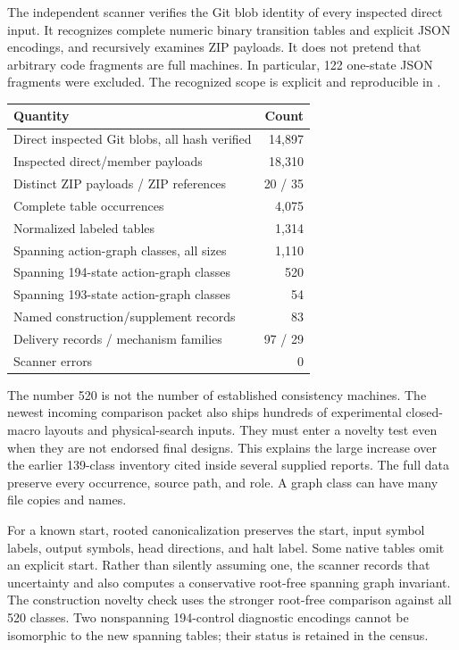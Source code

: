 \documentclass[11pt]{article}
\begin{document}
The independent scanner verifies the Git blob identity of every inspected
direct input. It recognizes complete numeric binary transition tables
and explicit JSON encodings, and recursively examines ZIP payloads.
It does not pretend that arbitrary code fragments are full machines.
In particular, 122 one-state JSON fragments were excluded. The recognized
scope is explicit and reproducible in .

\begin{center}
\begin{tabular}{lr}
\toprule
Quantity & Count\\
\midrule
Direct inspected Git blobs, all hash verified &14,897\\
Inspected direct/member payloads &18,310\\
Distinct ZIP payloads / ZIP references &20 / 35\\
Complete table occurrences &4,075\\
Normalized labeled tables &1,314\\
Spanning action-graph classes, all sizes &1,110\\
Spanning 194-state action-graph classes &520\\
Spanning 193-state action-graph classes &54\\
Named construction/supplement records &83\\
Delivery records / mechanism families &97 / 29\\
Scanner errors &0\\
\bottomrule
\end{tabular}
\end{center}

The number 520 is not the number of established consistency machines.
The newest incoming comparison packet also ships hundreds of experimental
closed-macro layouts and physical-search inputs. They must enter a
novelty test even when they are not endorsed final designs. This explains
the large increase over the earlier 139-class inventory cited inside
several supplied reports. The full data preserve every occurrence,
source path, and role. A graph class can have many file copies and names.

For a known start, rooted canonicalization preserves the start, input
symbol labels, output symbols, head directions, and halt label. Some
native tables omit an explicit start. Rather than silently assuming one,
the scanner records that uncertainty and also computes a conservative
root-free spanning graph invariant. The construction novelty check uses
the stronger root-free comparison against all 520 classes. Two
nonspanning 194-control diagnostic encodings cannot be isomorphic to the
new spanning tables; their status is retained in the census.
\end{document}
